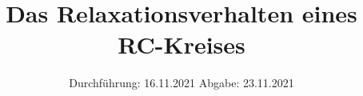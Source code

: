 

\subject{353}
\title{Das Relaxationsverhalten eines RC-Kreises}
\date{%
  Durchführung: 16.11.2021
  \hspace{3em}
  Abgabe: 23.11.2021
}



\maketitle
\thispagestyle{empty}
\tableofcontents
\newpage






\printbibliography{}

